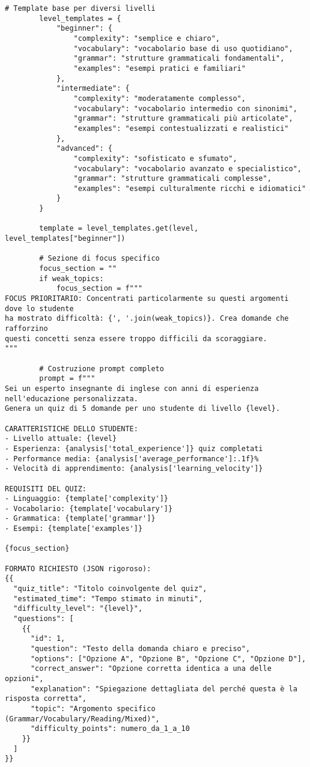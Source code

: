 \documentclass[a4paper, 14pt, oneside]{extbook}
\begin{document}
\begin{lstlisting}[style=pythonstyle, caption=Generatore Quiz Adattivo - Logica Avanzata, label=lst:adaptive-quiz]
        # Template base per diversi livelli
        level_templates = {
            "beginner": {
                "complexity": "semplice e chiaro",
                "vocabulary": "vocabolario base di uso quotidiano",
                "grammar": "strutture grammaticali fondamentali",
                "examples": "esempi pratici e familiari"
            },
            "intermediate": {
                "complexity": "moderatamente complesso",
                "vocabulary": "vocabolario intermedio con sinonimi",
                "grammar": "strutture grammaticali più articolate",
                "examples": "esempi contestualizzati e realistici"
            },
            "advanced": {
                "complexity": "sofisticato e sfumato",
                "vocabulary": "vocabolario avanzato e specialistico",
                "grammar": "strutture grammaticali complesse",
                "examples": "esempi culturalmente ricchi e idiomatici"
            }
        }
        
        template = level_templates.get(level, level_templates["beginner"])
        
        # Sezione di focus specifico
        focus_section = ""
        if weak_topics:
            focus_section = f"""
FOCUS PRIORITARIO: Concentrati particolarmente su questi argomenti dove lo studente 
ha mostrato difficoltà: {', '.join(weak_topics)}. Crea domande che rafforzino 
questi concetti senza essere troppo difficili da scoraggiare.
"""
        
        # Costruzione prompt completo
        prompt = f"""
Sei un esperto insegnante di inglese con anni di esperienza nell'educazione personalizzata.
Genera un quiz di 5 domande per uno studente di livello {level}.

CARATTERISTICHE DELLO STUDENTE:
- Livello attuale: {level}
- Esperienza: {analysis['total_experience']} quiz completati
- Performance media: {analysis['average_performance']:.1f}%
- Velocità di apprendimento: {analysis['learning_velocity']}

REQUISITI DEL QUIZ:
- Linguaggio: {template['complexity']}
- Vocabolario: {template['vocabulary']}
- Grammatica: {template['grammar']}
- Esempi: {template['examples']}

{focus_section}

FORMATO RICHIESTO (JSON rigoroso):
{{
  "quiz_title": "Titolo coinvolgente del quiz",
  "estimated_time": "Tempo stimato in minuti",
  "difficulty_level": "{level}",
  "questions": [
    {{
      "id": 1,
      "question": "Testo della domanda chiaro e preciso",
      "options": ["Opzione A", "Opzione B", "Opzione C", "Opzione D"],
      "correct_answer": "Opzione corretta identica a una delle opzioni",
      "explanation": "Spiegazione dettagliata del perché questa è la risposta corretta",
      "topic": "Argomento specifico (Grammar/Vocabulary/Reading/Mixed)",
      "difficulty_points": numero_da_1_a_10
    }}
  ]
}}


\end{lstlisting}
\end{document}
